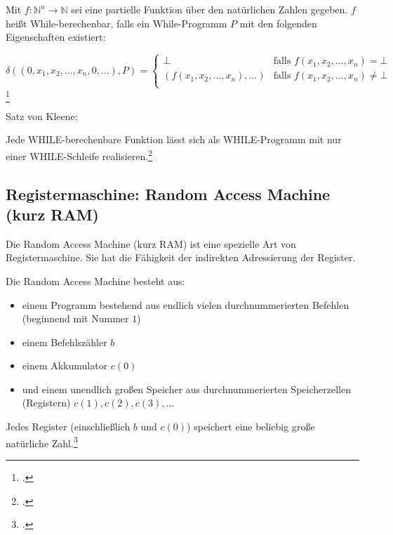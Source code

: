 \documentclass{lehramt-informatik-haupt}
\begin{document}
Mit $f : \mathbb{N}^n \rightarrow \mathbb{N}$ sei eine partielle
Funktion über den natürlichen Zahlen gegeben. $f$ heißt
While-berechenbar, falls ein While-Programm $P$ mit den folgenden
Eigenschaften existiert:

\begin{equation*}
\delta((0,x_1,x_2,\dots,x_n,0,\dots), P) =
\begin{cases}
\bot &
\text{falls } f(x_1,x_2,\dots,x_n) = \bot\\

(f(x_1,x_2,\dots,x_n), \dots) &
\text{falls }f(x_1,x_2,\dots,x_n) \neq \bot\\
\end{cases}
\end{equation*}\footcite[Seite 261]{hoffmann}

Satz von Kleene:

Jede WHILE-berechenbare Funktion lässt sich als WHILE-Programm mit nur
einer WHILE-Schleife realisieren.\footcite[Seite 13]{theo:fs:4}

%

\subsection{Registermaschine: Random Access Machine (kurz RAM)}

Die Random Access Machine (kurz RAM) ist eine spezielle Art von
Registermaschine. Sie hat die Fähigkeit der indirekten Adressierung der
Register.

Die Random Access Machine besteht aus:

\begin{itemize}
\item einem Programm bestehend aus endlich vielen durchnummerierten
Befehlen (beginnend mit Nummer $1$)

\item einem Befehlszähler $b$

\item einem Akkumulator $c(0)$

\item und einem unendlich großen Speicher aus durchnummerierten
Speicherzellen (Registern) $c(1), c(2), c(3), \dots$
\end{itemize}

Jedes Register (einschließlich $b$ und $c(0)$) speichert eine beliebig
große natürliche Zahl.\footcite{wiki:registermaschine}
\end{document}
